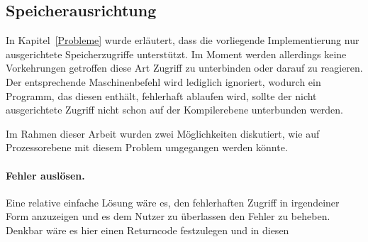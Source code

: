 \subsection{Speicherausrichtung}
In Kapitel~\ref{Probleme} wurde erläutert, dass die vorliegende Implementierung nur ausgerichtete Speicherzugriffe unterstützt.
Im Moment werden allerdings keine Vorkehrungen getroffen diese Art Zugriff zu unterbinden oder darauf zu reagieren.
Der entsprechende Maschinenbefehl wird lediglich ignoriert, wodurch ein Programm, das diesen enthält, fehlerhaft ablaufen wird, sollte der nicht ausgerichtete Zugriff nicht schon auf der Kompilerebene unterbunden werden.

Im Rahmen dieser Arbeit wurden zwei Möglichkeiten diskutiert, wie auf Prozessorebene mit diesem Problem umgegangen werden könnte.

\paragraph{Fehler auslösen.}
Eine relative einfache Lösung wäre es, den fehlerhaften Zugriff in irgendeiner Form anzuzeigen und es dem Nutzer zu überlassen den Fehler zu beheben.
Denkbar wäre es hier einen Returncode festzulegen und in diesen 




\iffalse
- den Zugriff auflösen zu Byte-Zugriff -> sehr langsam
- mit compiler von vornherein unterbinden
- return code
\fi

